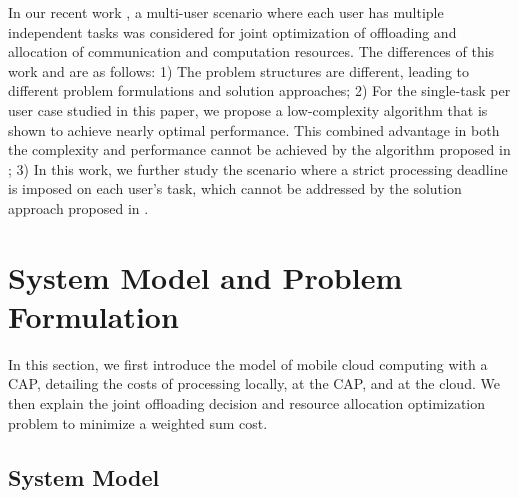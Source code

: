 \documentclass[10pt,journal,compsoc]{IEEEtran}
\begin{document}
In our recent work \cite{chen2017infocom}, a multi-user scenario
where each user has multiple independent tasks was considered for
joint optimization of offloading and allocation of communication and
computation resources. The differences of this work and
\cite{chen2017infocom} are as follows: 1) The problem structures are
different, leading to different problem formulations and solution
approaches; 2) For the single-task per user case studied in this
paper, we propose a low-complexity algorithm that is shown to
achieve nearly optimal performance. This combined advantage in both
the complexity and performance cannot be achieved by the algorithm
proposed in \cite{chen2017infocom}; 3) In this work, we further
study the scenario where a strict processing deadline is imposed on
each user's task, which cannot be addressed by the solution approach
proposed in \cite{chen2017infocom}.

\section{System Model and Problem Formulation}\label{sec_system_model}
In this section, we first introduce the model of mobile cloud
computing with a CAP, detailing the costs of processing locally, at
the CAP, and at the cloud. We then explain the joint offloading
decision and resource allocation optimization problem to minimize a
weighted sum cost.

\subsection{System Model}
\end{document}
